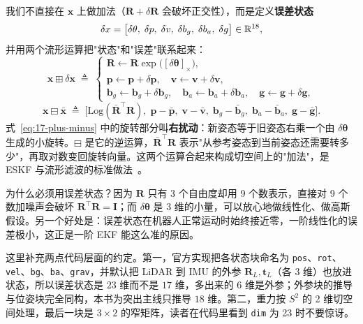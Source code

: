 我们不直接在 $\bm{x}$ 上做加法（$\bm{R}+\delta\bm{R}$ 会破坏正交性），而是定义\textbf{误差状态}
\begin{equation}\label{eq:17-error-state}
  \delta x=\bigl[\delta\theta,\;\delta p,\;\delta v,\;\delta b_g,\;\delta b_a,\;\delta g\bigr]\in\mathbb{R}^{18},
\end{equation}
并用两个流形运算把"状态"和"误差"联系起来：
\begin{equation}\label{eq:17-plus-minus}
  \bm{x}\boxplus\delta\bm{x}\;\triangleq\;
  \begin{cases}
    \bm{R}\leftarrow\bm{R}\exp\bigl([\delta\bm{\theta}]_\times\bigr),\\
    \bm{p}\leftarrow\bm{p}+\delta\bm{p},\quad \bm{v}\leftarrow\bm{v}+\delta\bm{v},\\
    \bm{b}_g\leftarrow\bm{b}_g+\delta\bm{b}_g,\quad \bm{b}_a\leftarrow\bm{b}_a+\delta\bm{b}_a,\quad \bm{g}\leftarrow\bm{g}+\delta\bm{g},
  \end{cases}
\end{equation}
\begin{equation}
  \bm{x}\boxminus\bar{\bm{x}}\;\triangleq\;
  \bigl[\mathrm{Log}(\bar{\bm{R}}^{\top}\bm{R}),\;\bm{p}-\bar{\bm{p}},\;\bm{v}-\bar{\bm{v}},\;\bm{b}_g-\bar{\bm{b}}_g,\;\bm{b}_a-\bar{\bm{b}}_a,\;\bm{g}-\bar{\bm{g}}\bigr].
\end{equation}
式~\eqref{eq:17-plus-minus} 中的旋转部分叫\textbf{右扰动}：新姿态等于旧姿态右乘一个由 $\delta\bm{\theta}$ 生成的小旋转。$\boxminus$ 是它的逆运算，$\bar{\bm{R}}^{\top}\bm{R}$ 表示"从参考姿态到当前姿态还需要转多少"，再取对数变回旋转向量。这两个运算合起来构成切空间上的"加法"，是 ESKF 与流形滤波的标准做法~\cite{sola2017eskf}。

为什么必须用误差状态？因为 $\bm{R}$ 只有 3 个自由度却用 9 个数表示，直接对 9 个数加噪声会破坏 $\bm{R}^{\top}\bm{R}=\bm{I}$；而 $\delta\bm{\theta}$ 是 3 维的小量，可以放心地做线性化、做高斯假设。另一个好处是：误差状态在机器人正常运动时始终接近零，一阶线性化的误差极小，这正是一阶 EKF 能这么准的原因。

这里补充两点代码层面的约定。第一，官方实现把各状态块命名为 \texttt{pos}、\texttt{rot}、\texttt{vel}、\texttt{bg}、\texttt{ba}、\texttt{grav}，并默认把 LiDAR 到 IMU 的外参 $\bm{R}_L,\bm{t}_L$（各 3 维）也放进状态，所以误差状态是 $23$ 维而不是 $17$ 维，多出来的 6 维是外参；外参块的推导与位姿块完全同构，本书为突出主线只推导 $18$ 维。第二，重力按 $S^2$ 的 2 维切空间处理，最后一块是 $3\times2$ 的窄矩阵，读者在代码里看到 \texttt{dim} 为 23 时不要惊讶。

